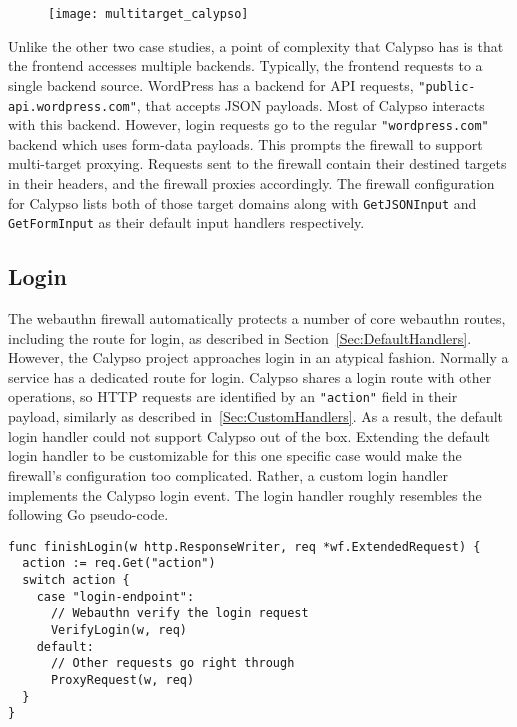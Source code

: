 \begin{figure}[h]
  \centering
  \texttt{[image: multitarget\_calypso]}
\end{figure}

Unlike the other two case studies, a point of complexity that Calypso has is that the frontend accesses multiple backends. Typically, the frontend requests to a single backend source. WordPress has a backend for API requests, \lstinline{"public-api.wordpress.com"}, that accepts JSON payloads. Most of Calypso interacts with this backend. However, login requests go to the regular \lstinline{"wordpress.com"} backend which uses form-data payloads. This prompts the firewall to support multi-target proxying. Requests sent to the firewall contain their destined targets in their headers, and the firewall proxies accordingly. The firewall configuration for Calypso lists both of those target domains along with \lstinline{GetJSONInput} and \lstinline{GetFormInput} as their default input handlers respectively. 

\subsection{Login}\label{Sec:CalypsoLogin}

The webauthn firewall automatically protects a number of core webauthn routes, including the route for login, as described in Section~\ref{Sec:DefaultHandlers}. However, the Calypso project approaches login in an atypical fashion. Normally a service has a dedicated route for login. Calypso shares a login route with other operations, so HTTP requests are identified by an \lstinline{"action"} field in their payload, similarly as described in~\ref{Sec:CustomHandlers}. As a result, the default login handler could not support Calypso out of the box. Extending the default login handler to be customizable for this one specific case would make the firewall's configuration too complicated. Rather, a custom login handler implements the Calypso login event. The login handler roughly resembles the following Go pseudo-code.

\begin{lstlisting}[float=h]
func finishLogin(w http.ResponseWriter, req *wf.ExtendedRequest) {
  action := req.Get("action")
  switch action {
    case "login-endpoint":
      // Webauthn verify the login request
      VerifyLogin(w, req)
    default:
      // Other requests go right through
      ProxyRequest(w, req)
  }
}
\end{lstlisting}

